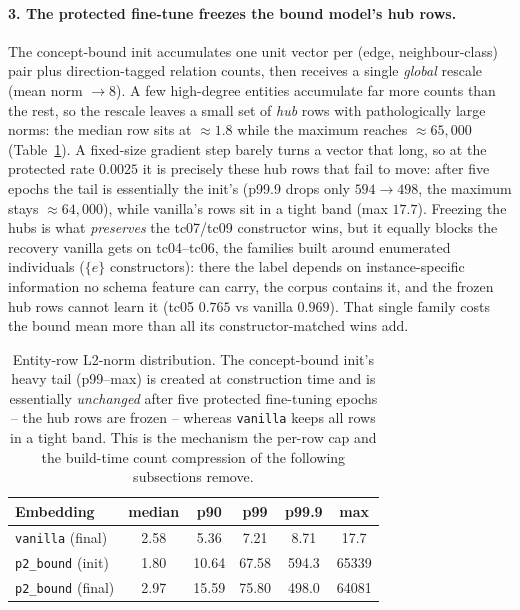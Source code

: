 \documentclass[a4paper,oneside,bibliography=totoc]{scrbook}
\begin{document}
\paragraph{3. The protected fine-tune freezes the bound model's hub rows.}
The concept-bound init accumulates one unit vector per (edge, neighbour-class)
pair plus direction-tagged relation counts, then receives a single
\emph{global} rescale (mean norm $\rightarrow 8$). A few high-degree entities
accumulate far more counts than the rest, so the rescale leaves a small set of
\emph{hub} rows with pathologically large norms: the median row sits at
$\approx 1.8$ while the maximum reaches $\approx 65{,}000$
(Table~\ref{tab:dbpedia_norms}). A fixed-size gradient step barely turns a vector
that long, so at the protected rate $0.0025$ it is precisely these hub rows that
fail to move: after five epochs the tail is essentially the init's
(p99.9 drops only $594 \rightarrow 498$, the maximum stays $\approx 64{,}000$),
while vanilla's rows sit in a tight band (max $17.7$). Freezing the hubs is what
\emph{preserves} the tc07/tc09 constructor wins, but it equally blocks the
recovery vanilla gets on tc04--tc06, the families built around enumerated
individuals ($\{e\}$ constructors): there the label depends on instance-specific
information no schema feature can carry, the corpus contains it, and the frozen
hub rows cannot learn it (tc05 $0.765$ vs vanilla $0.969$). That single family
costs the bound mean more than all its constructor-matched wins add.

\begin{table}[t]
\centering
\small
\caption{Entity-row L2-norm distribution. The concept-bound init's heavy tail
(p99--max) is created at construction time and is essentially \emph{unchanged}
after five protected fine-tuning epochs -- the hub rows are frozen -- whereas
\texttt{vanilla} keeps all rows in a tight band. This is the mechanism the
per-row cap and the build-time count compression of the following subsections
remove.}
\label{tab:dbpedia_norms}
\begin{tabular}{lccccc}
\toprule
\textbf{Embedding} & \textbf{median} & \textbf{p90} & \textbf{p99} & \textbf{p99.9} & \textbf{max} \\
\midrule
\texttt{vanilla} (final)        & 2.58 & 5.36  & 7.21  & 8.71  & 17.7 \\
\texttt{p2\_bound} (init)       & 1.80 & 10.64 & 67.58 & 594.3 & 65339 \\
\texttt{p2\_bound} (final)      & 2.97 & 15.59 & 75.80 & 498.0 & 64081 \\
\bottomrule
\end{tabular}
\end{table}
\end{document}
